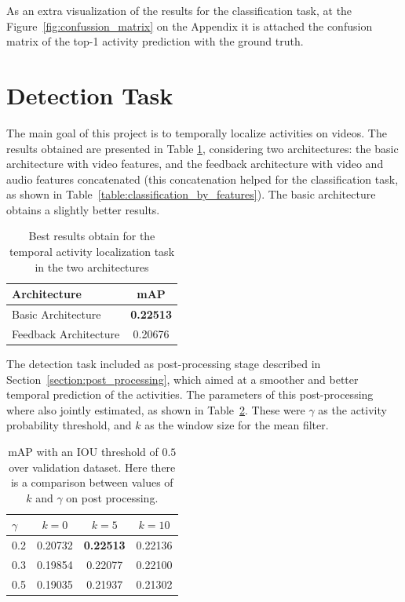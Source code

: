 As an extra visualization of the results for the classification task, at the Figure~\ref{fig:confussion_matrix} on the Appendix it is attached the confusion matrix of the top-1 activity prediction with the ground truth.



\section{Detection Task}

The main goal of this project is to temporally localize activities on videos. The results obtained are presented in Table \ref{table:detection_architecture_comparison}, considering two architectures: the basic architecture with video features, and the feedback architecture with video and audio features concatenated (this concatenation helped for the classification task, as shown in Table~\ref{table:classification_by_features}).
The basic architecture obtains a slightly better results.

\begin{table}[H]
\begin{center}
\begin{tabular}{|l|c|}
\hline
Architecture & mAP \\
\hline\hline
Basic Architecture & \bf0.22513 \\
Feedback Architecture & 0.20676 \\
\hline
\end{tabular}
\end{center}
\caption{Best results obtain for the temporal activity localization task in the two architectures}
\label{table:detection_architecture_comparison}
\end{table}

The detection task included as post-processing stage described in Section~\ref{section:post_processing}, which aimed at a smoother and better temporal prediction of the activities.
The parameters of this post-processing where also jointly estimated, as shown in Table~\ref{table:detection_postprocessing_comparison}.
These were $\gamma$ as the activity probability threshold, and $k$ as the window size for the mean filter.

\begin{table}[H]
\begin{center}
\begin{tabular}{|l|c|c|c|}
\hline
$\gamma$ & $k=0$ & $k=5$ & $k=10$ \\
\hline
0.2 & 0.20732 & \bf0.22513 & 0.22136 \\
0.3 & 0.19854 & 0.22077 & 0.22100 \\
0.5 & 0.19035 & 0.21937 & 0.21302 \\
\hline
\end{tabular}
\end{center}
\caption{mAP with an IOU threshold of $0.5$ over validation dataset. Here there is a comparison
between values of $k$ and $\gamma$ on post processing.}
\label{table:detection_postprocessing_comparison}
\end{table}


